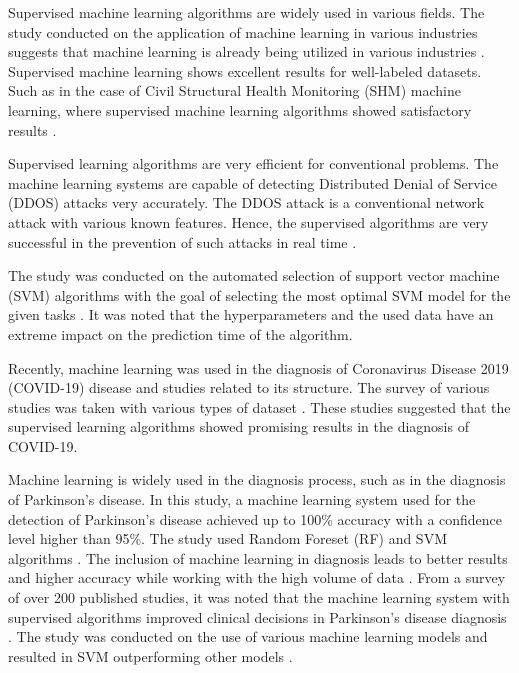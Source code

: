 \documentclass[a4paper,fleqn]{cas-dc}
\newcommand{\responsemod}{\color{blue}}
\begin{document}
{\responsemod
    Supervised machine learning algorithms are widely used in various fields. The study conducted on the application of machine learning in various industries suggests that machine learning is already being utilized in various industries \cite{ref_paper_14}. Supervised machine learning shows excellent results for well-labeled datasets. Such as in the case of Civil Structural Health Monitoring (SHM) machine learning, where supervised machine learning algorithms showed satisfactory results \cite{ref_paper_6}.
    
    Supervised learning algorithms are very efficient for conventional problems. The machine learning systems are capable of detecting Distributed Denial of Service (DDOS) attacks very accurately. The DDOS attack is a conventional network attack with various known features. Hence, the supervised algorithms are very successful in the prevention of such attacks in real time \cite{ref_paper_9}.
    
    The study was conducted on the automated selection of support vector machine (SVM) algorithms with the goal of selecting the most optimal SVM model for the given tasks \cite{ref_paper_2}. It was noted that the hyperparameters and the used data have an extreme impact on the prediction time of the algorithm.
    
    Recently, machine learning was used in the diagnosis of Coronavirus Disease 2019 (COVID-19) disease and studies related to its structure. The survey of various studies was taken with various types of dataset \cite{ref_paper_20}. These studies suggested that the supervised learning algorithms showed promising results in the diagnosis of COVID-19.
    
    Machine learning is widely used in the diagnosis process, such as in the diagnosis of Parkinson's disease. In this study, a machine learning system used for the detection of Parkinson's disease achieved up to 100\% accuracy with a confidence level higher than 95\%. The study used Random Foreset (RF) and SVM algorithms \cite{ref_paper_34}. The inclusion of machine learning in diagnosis leads to better results and higher accuracy while working with the high volume of data \cite{ref_paper_15}. From a survey of over 200 published studies, it was noted that the machine learning system with supervised algorithms improved clinical decisions in Parkinson's disease diagnosis \cite{ref_paper_27}. The study was conducted on the use of various machine learning models and resulted in SVM outperforming other models \cite{ref_paper_30}.
    
}
\end{document}
